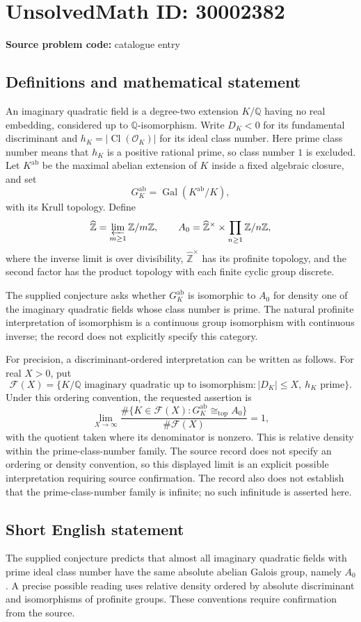 \documentclass[11pt]{article}
\newcommand{\Z}{\mathbb{Z}}
\newcommand{\Q}{\mathbb{Q}}
\begin{document}
\section*{UnsolvedMath ID: 30002382}
\textbf{Source problem code:} catalogue entry
\subsection{Definitions and mathematical statement}
An imaginary quadratic field is a degree-two extension \(K/\Q\) having no real embedding, considered up to \(\Q\)-isomorphism. Write \(D_K<0\) for its fundamental discriminant and \(h_K=|\operatorname{Cl}(\mathcal O_K)|\) for its ideal class number. Here prime class number means that \(h_K\) is a positive rational prime, so class number \(1\) is excluded. Let \(K^{\mathrm{ab}}\) be the maximal abelian extension of \(K\) inside a fixed algebraic closure, and set
\[
G_K^{\mathrm{ab}}=\operatorname{Gal}(K^{\mathrm{ab}}/K),
\]
with its Krull topology. Define
\[
\widehat{\Z}=\varprojlim_{m\geq 1}\Z/m\Z,
\qquad
A_0=\widehat{\Z}^{\times}\times\prod_{n\geq 1}\Z/n\Z,
\]
where the inverse limit is over divisibility, \(\widehat{\Z}^{\times}\) has its profinite topology, and the second factor has the product topology with each finite cyclic group discrete.

The supplied conjecture asks whether \(G_K^{\mathrm{ab}}\) is isomorphic to \(A_0\) for density one of the imaginary quadratic fields whose class number is prime. The natural profinite interpretation of isomorphism is a continuous group isomorphism with continuous inverse; the record does not explicitly specify this category.

For precision, a discriminant-ordered interpretation can be written as follows. For real \(X>0\), put
\[
\mathcal F(X)=\{K/\Q\text{ imaginary quadratic up to isomorphism}: |D_K|\leq X,\ h_K\text{ prime}\}.
\]
Under this ordering convention, the requested assertion is
\[
\lim_{X\to\infty}
\frac{\#\{K\in\mathcal F(X):G_K^{\mathrm{ab}}\cong_{\mathrm{top}}A_0\}}
{\#\mathcal F(X)}=1,
\]
with the quotient taken where its denominator is nonzero. This is relative density within the prime-class-number family. The source record does not specify an ordering or density convention, so this displayed limit is an explicit possible interpretation requiring source confirmation. The record also does not establish that the prime-class-number family is infinite; no such infinitude is asserted here.
\subsection{Short English statement}
The supplied conjecture predicts that almost all imaginary quadratic fields with prime ideal class number have the same absolute abelian Galois group, namely \(A_0\). A precise possible reading uses relative density ordered by absolute discriminant and isomorphisms of profinite groups. These conventions require confirmation from the source.
\end{document}
